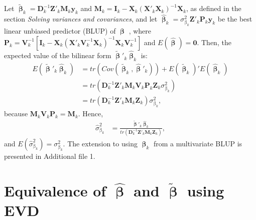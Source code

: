 \documentclass{bmcart}
\begin{document}
Let $\tilde{\mathbf{\upbeta}}_k = \mathbf{D}^{-1}_k\mathbf{Z}'_k\mathbf{M}_k\mathbf{y}_k$ and $\mathbf{M}_k = \mathbf{I}_k - \mathbf{X}_k(\mathbf{X}'_k\mathbf{X}_k)^{-1}\mathbf{X}_k$, as defined in the section \textsl{Solving variances and covariances}, and let $\hat{\mathbf{\upbeta}}_k = \sigma^2_{\upbeta_k}\mathbf{Z}'_k\mathbf{P}_k\mathbf{y}_k$ be the best linear unbiased predictor (BLUP) of $\mathbf{\upbeta}$ \cite{Searle1992}, where $\mathbf{P}_k = \mathbf{V}^{-1}_k[\mathbf{I}_k-\mathbf{X}_k(\mathbf{X}'_k\mathbf{V}^{-1}_k\mathbf{X}_k)^{-1}\mathbf{X}_k\mathbf{V}^{-1}_k]$ and $E(\hat{\mathbf{\upbeta}}) = \mathbf{0}$. Then, the expected value of the bilinear form  $\tilde{\mathbf{\upbeta}}'_k\hat{\mathbf{\upbeta}}_k$ \cite{Searl71} is:
\begin{align*}
    E(\tilde{\mathbf{\upbeta}}'_k\hat{\mathbf{\upbeta}}_k) &= tr(Cov(\tilde{\mathbf{\upbeta}}_k, \hat{\mathbf{\upbeta}}'_k)) + E(\tilde{\mathbf{\upbeta}}_k)'E(\hat{\mathbf{\upbeta}}_k)\\
    &= tr(\mathbf{D}^{-1}_k\mathbf{Z}'_k\mathbf{M}_k\mathbf{V}_k\mathbf{P}_k\mathbf{Z}_k\sigma^2_{\upbeta_k})\\
    &= tr(\mathbf{D}^{-1}_k\mathbf{Z}'_k\mathbf{M}_k\mathbf{Z}_k)\sigma^2_{\upbeta_k},
\end{align*}
because $\mathbf{M}_k\mathbf{V}_k\mathbf{P}_k = \mathbf{M}_k$. Hence, 
\begin{align*}
    \hat{\sigma}^2_{\upbeta_k} &= \frac{\tilde{\mathbf{\upbeta}}'_k\hat{\mathbf{\upbeta}}_k}{tr(\mathbf{D}^{-1}_k\mathbf{Z}'_k\mathbf{M}_k\mathbf{Z}_k)},
\end{align*}
and $E(\hat{\sigma}^2_{\upbeta_k}) = \sigma^2_{\upbeta_k}$. The extension to using $\hat{\mathbf{\upbeta}}_k$ from a multivariate BLUP is presented in Additional file 1.

\section{Equivalence of $\hat{\mathbf{\upbeta}}$ and $\tilde{\mathbf{\upbeta}}$ using EVD} \label{ExactTH}
\end{document}
